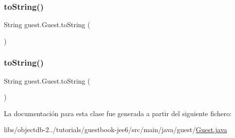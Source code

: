\subsubsection{\texorpdfstring{toString()}{toString()}\hspace{0.1cm}{\footnotesize\ttfamily [2/3]}}
{\footnotesize\ttfamily String guest.\+Guest.\+to\+String (\begin{DoxyParamCaption}{ }\end{DoxyParamCaption})}

\mbox{\label{classguest_1_1_guest_ac4c1ef33075541a404cdbed4da0477a7}} 
\subsubsection{\texorpdfstring{toString()}{toString()}\hspace{0.1cm}{\footnotesize\ttfamily [3/3]}}
{\footnotesize\ttfamily String guest.\+Guest.\+to\+String (\begin{DoxyParamCaption}{ }\end{DoxyParamCaption})}



La documentación para esta clase fue generada a partir del siguiente fichero\+:\begin{DoxyCompactItemize}
\item 
libs/objectdb-\/2../tutorials/guestbook-\/jee6/src/main/java/guest/\mbox{\hyperlink{guestbook-jee6_2src_2main_2java_2guest_2_guest_8java}{Guest.\+java}}\end{DoxyCompactItemize}
